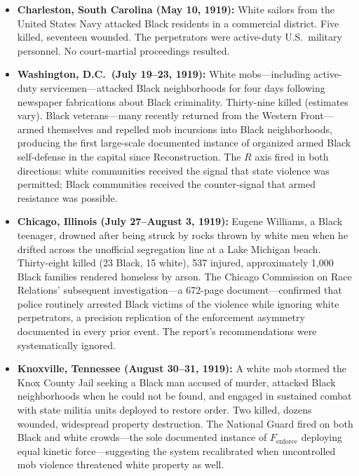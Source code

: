 \begin{itemize}
    \begin{itemize}
        \item \textbf{Charleston, South Carolina (May 10, 1919):} White sailors from the United States Navy attacked Black residents in a commercial district. Five killed, seventeen wounded. The perpetrators were active-duty U.S.\ military personnel. No court-martial proceedings resulted.

        \item \textbf{Washington, D.C.\ (July 19--23, 1919):} White mobs---including active-duty servicemen---attacked Black neighborhoods for four days following newspaper fabrications about Black criminality. Thirty-nine killed (estimates vary). Black veterans---many recently returned from the Western Front---armed themselves and repelled mob incursions into Black neighborhoods, producing the first large-scale documented instance of organized armed Black self-defense in the capital since Reconstruction. The $R$ axis fired in both directions: white communities received the signal that state violence was permitted; Black communities received the counter-signal that armed resistance was possible.

        \item \textbf{Chicago, Illinois (July 27--August 3, 1919):} Eugene Williams, a Black teenager, drowned after being struck by rocks thrown by white men when he drifted across the unofficial segregation line at a Lake Michigan beach. Thirty-eight killed (23 Black, 15 white), 537 injured, approximately 1,000 Black families rendered homeless by arson. The Chicago Commission on Race Relations' subsequent investigation---a 672-page document---confirmed that police routinely arrested Black victims of the violence while ignoring white perpetrators, a precision replication of the enforcement asymmetry documented in every prior event. The report's recommendations were systematically ignored.

        \item \textbf{Knoxville, Tennessee (August 30--31, 1919):} A white mob stormed the Knox County Jail seeking a Black man accused of murder, attacked Black neighborhoods when he could not be found, and engaged in sustained combat with state militia units deployed to restore order. Two killed, dozens wounded, widespread property destruction. The National Guard fired on both Black and white crowds---the sole documented instance of $F_{\text{enforce}}$ deploying equal kinetic force---suggesting the system recalibrated when uncontrolled mob violence threatened white property as well.


\end{itemize}
\end{itemize}
